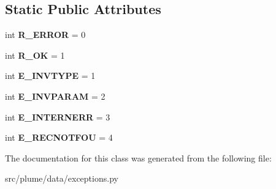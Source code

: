 \subsection*{Static Public Attributes}
\begin{DoxyCompactItemize}
\item 
int {\bfseries R\+\_\+\+E\+R\+R\+OR} = 0\hypertarget{classplume-creator_1_1src_1_1plume_1_1data_1_1exceptions_1_1_db_err_af07b8934c327de2a599f714a0dc7531f}{}\label{classplume-creator_1_1src_1_1plume_1_1data_1_1exceptions_1_1_db_err_af07b8934c327de2a599f714a0dc7531f}

\item 
int {\bfseries R\+\_\+\+OK} = 1\hypertarget{classplume-creator_1_1src_1_1plume_1_1data_1_1exceptions_1_1_db_err_aa524dbb81399ab5eca243590b8f9fe9e}{}\label{classplume-creator_1_1src_1_1plume_1_1data_1_1exceptions_1_1_db_err_aa524dbb81399ab5eca243590b8f9fe9e}

\item 
int {\bfseries E\+\_\+\+I\+N\+V\+T\+Y\+PE} = 1\hypertarget{classplume-creator_1_1src_1_1plume_1_1data_1_1exceptions_1_1_db_err_a0b3fbdf5dc24018aa0f687bdeb99f564}{}\label{classplume-creator_1_1src_1_1plume_1_1data_1_1exceptions_1_1_db_err_a0b3fbdf5dc24018aa0f687bdeb99f564}

\item 
int {\bfseries E\+\_\+\+I\+N\+V\+P\+A\+R\+AM} = 2\hypertarget{classplume-creator_1_1src_1_1plume_1_1data_1_1exceptions_1_1_db_err_aee16e716f53669a359614bc6cd595d1d}{}\label{classplume-creator_1_1src_1_1plume_1_1data_1_1exceptions_1_1_db_err_aee16e716f53669a359614bc6cd595d1d}

\item 
int {\bfseries E\+\_\+\+I\+N\+T\+E\+R\+N\+E\+RR} = 3\hypertarget{classplume-creator_1_1src_1_1plume_1_1data_1_1exceptions_1_1_db_err_abb861ec728fb12d368ec860cd6e934da}{}\label{classplume-creator_1_1src_1_1plume_1_1data_1_1exceptions_1_1_db_err_abb861ec728fb12d368ec860cd6e934da}

\item 
int {\bfseries E\+\_\+\+R\+E\+C\+N\+O\+T\+F\+OU} = 4\hypertarget{classplume-creator_1_1src_1_1plume_1_1data_1_1exceptions_1_1_db_err_a395cff6c86dda55548c783abad5bf438}{}\label{classplume-creator_1_1src_1_1plume_1_1data_1_1exceptions_1_1_db_err_a395cff6c86dda55548c783abad5bf438}

\end{DoxyCompactItemize}


The documentation for this class was generated from the following file\+:\begin{DoxyCompactItemize}
\item 
src/plume/data/exceptions.\+py\end{DoxyCompactItemize}
